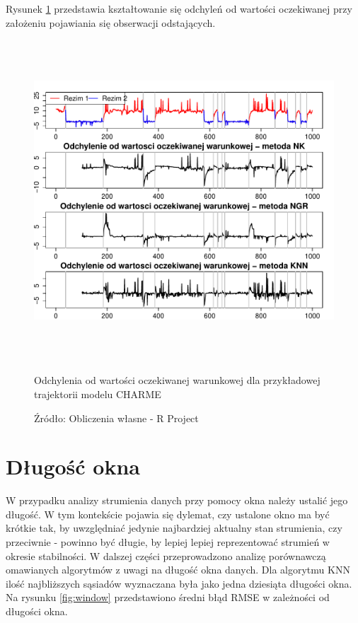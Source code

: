 \documentclass[man,mfu]{mgrwms}
\begin{document}
Rysunek \ref{fig:outcharme} przedstawia kształtowanie się odchyleń od wartości oczekiwanej przy założeniu pojawiania się obserwacji odstających.

\begin{figure}[H]
\centering
\includegraphics[width=160mm,height = 120mm]{outcharme}
\caption{Odchylenia od wartości oczekiwanej warunkowej dla przykładowej trajektorii modelu CHARME}
\caption*{Źródło: Obliczenia własne - R Project}
\label{fig:outcharme}
\end{figure}


\section{Długość okna}

W przypadku analizy strumienia danych przy pomocy okna należy ustalić jego długość. W tym kontekście pojawia się dylemat, czy ustalone okno ma być krótkie tak, by uwzględniać jedynie najbardziej aktualny stan strumienia, czy przeciwnie - powinno być długie, by lepiej lepiej reprezentować strumień w okresie stabilności. W dalszej części przeprowadzono analizę  porównawczą omawianych algorytmów z uwagi na długość okna danych. Dla algorytmu KNN ilość najbliższych sąsiadów wyznaczana była jako jedna dziesiąta długości okna. Na rysunku \ref{fig:window} przedstawiono średni błąd RMSE w zależności od długości okna.
\end{document}

